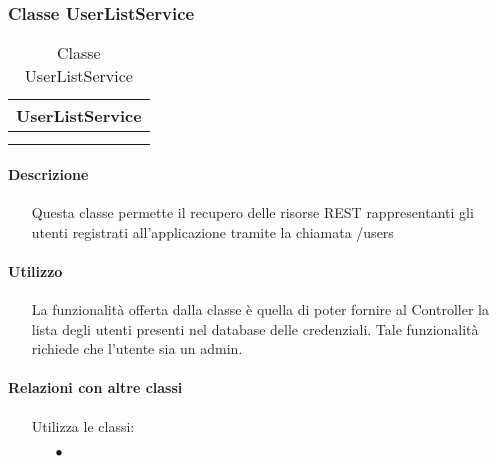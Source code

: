 \subsubsection{Classe UserListService}

\begin{table}[ht]
\begin{center}
\bgroup
\setlength{\arrayrulewidth}{0.6mm}
\def\arraystretch{1}
\begin{tabular}{ | p{12cm} | }
\hline
\centerline{\textbf{UserListService}}
\\ \hline
 \\ 
\hline
 \\ 
\hline
\end{tabular}
\egroup
\caption{Classe UserListService}
\end{center}
\end{table}

\paragraph*{Descrizione}
\begin{itemize}
\item[] Questa classe permette il recupero delle risorse REST rappresentanti gli utenti registrati all'applicazione tramite la chiamata /users
\end{itemize}

\paragraph*{Utilizzo}
\begin{itemize}
\item[] La funzionalità offerta dalla classe è quella di poter fornire al Controller la lista degli utenti presenti nel database delle credenziali.
Tale funzionalità richiede che l'utente sia un admin.
\end{itemize}

\paragraph*{Relazioni con altre classi}
\begin{itemize}


\item[] Utilizza le classi:
\begin{itemize}
\item[$\bullet$] 
\end{itemize}
\end{itemize}

